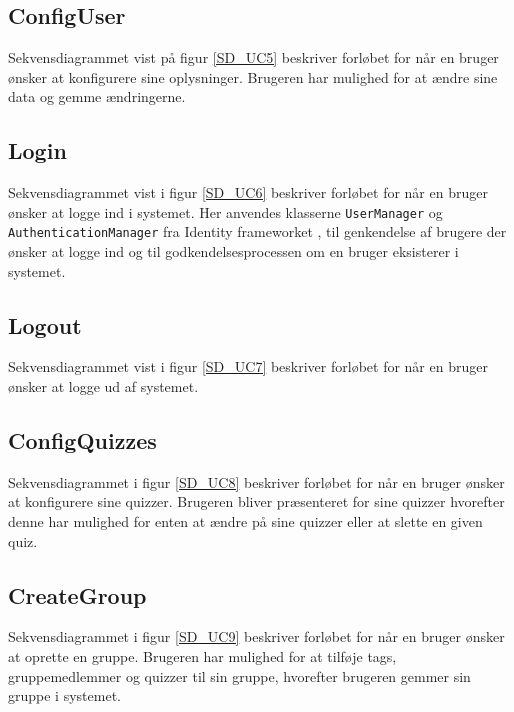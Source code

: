 
\subsection*{ConfigUser}
Sekvensdiagrammet vist på figur \ref{SD_UC5} beskriver forløbet for når en bruger ønsker at konfigurere sine oplysninger. Brugeren har mulighed for at ændre sine data og gemme ændringerne.


\subsection*{Login}
Sekvensdiagrammet vist i figur \ref{SD_UC6} beskriver forløbet for når en bruger ønsker at logge ind i systemet. Her anvendes klasserne \verb+UserManager+ og \verb+AuthenticationManager+ fra Identity frameworket \citep{msdnIdentityFrameworkWeb}, til genkendelse af brugere der ønsker at logge ind og til godkendelsesprocessen om en bruger eksisterer i systemet.


\subsection*{Logout}
Sekvensdiagrammet vist i figur \ref{SD_UC7} beskriver forløbet for når en bruger ønsker at logge ud af systemet.


\subsection*{ConfigQuizzes}
Sekvensdiagrammet i figur \ref{SD_UC8} beskriver forløbet for når en bruger ønsker at konfigurere sine quizzer. Brugeren bliver præsenteret for sine quizzer hvorefter denne har mulighed for enten at ændre på sine quizzer eller at slette en given quiz.


\subsection*{CreateGroup}
Sekvensdiagrammet i figur \ref{SD_UC9} beskriver forløbet for når en bruger ønsker at oprette en gruppe. Brugeren har mulighed for at tilføje tags, gruppemedlemmer og quizzer til sin gruppe, hvorefter brugeren gemmer sin gruppe i systemet.


